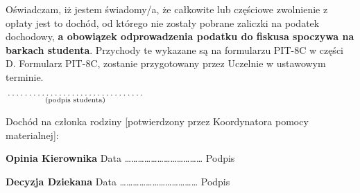 \documentclass[a4paper,11pt]{article}
\newcommand{\fillField}[2]{
    $\underset{\text{#1}}{\parbox[t]{#2}{\dotfill}}$
}
\begin{document}
\noindent
{\footnotesize Oświadczam, iż jestem świadomy/a, że całkowite lub częściowe zwolnienie z opłaty jest to dochód, od którego nie zostały pobrane zaliczki na podatek dochodowy, \textbf{a obowiązek odprowadzenia podatku do fiskusa spoczywa na barkach studenta}. Przychody te wykazane są na formularzu PIT-8C w części D. Formularz PIT-8C, zostanie przygotowany przez Uczelnie w ustawowym terminie}.

\vskip 0.4cm
\hspace{\fill} \fillField{(podpis studenta)}{5cm} \hspace{2.0cm}
\vskip 0.4cm

\noindent
Dochód na członka rodziny {\tiny[potwierdzony przez Koordynatora pomocy materialnej]}: \dotfill
\vskip 1cm

\noindent
\textbf{Opinia Kierownika} \dotfill
\vskip 0.5cm
\noindent
Data ……………………………… Podpis \dotfill
\vskip 0.4cm

\noindent
\textbf{Decyzja Dziekana} \dotfill
\vskip 0.5cm
\noindent
Data ……………………………… Podpis \dotfill
\end{document}
